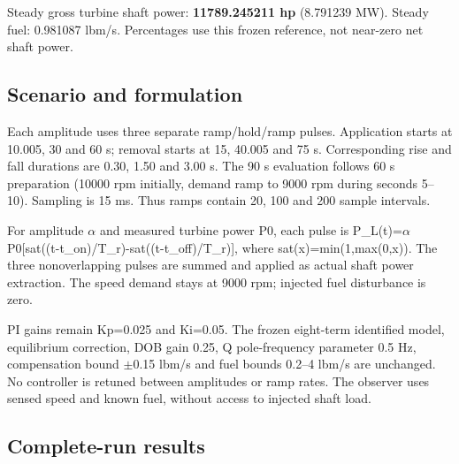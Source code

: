 Steady gross turbine shaft power: \textbf{11789.245211 hp} (8.791239 MW). Steady fuel: 0.981087 lbm/s. Percentages use this frozen reference, not near-zero net shaft power.

\subsection{Scenario and formulation}

Each amplitude uses three separate ramp/hold/ramp pulses. Application starts at 10.005, 30 and 60 s; removal starts at 15, 40.005 and 75 s. Corresponding rise and fall durations are 0.30, 1.50 and 3.00 s. The 90 s evaluation follows 60 s preparation (10000 rpm initially, demand ramp to 9000 rpm during seconds 5--10). Sampling is 15 ms. Thus ramps contain 20, 100 and 200 sample intervals.

For amplitude $\alpha$ and measured turbine power P0, each pulse is P\_\allowbreak L(t)=$\alpha$P0[sat((t-t\_\allowbreak on)/T\_\allowbreak r)-sat((t-t\_\allowbreak off)/T\_\allowbreak r)], where sat(x)=min(1,max(0,x)). The three nonoverlapping pulses are summed and applied as actual shaft power extraction. The speed demand stays at 9000 rpm; injected fuel disturbance is zero.

PI gains remain Kp=0.025 and Ki=0.05. The frozen eight-term identified model, equilibrium correction, DOB gain 0.25, Q pole-frequency parameter 0.5 Hz, compensation bound $\pm$0.15 lbm/s and fuel bounds 0.2--4 lbm/s are unchanged. No controller is retuned between amplitudes or ramp rates. The observer uses sensed speed and known fuel, without access to injected shaft load.

\subsection{Complete-run results}

